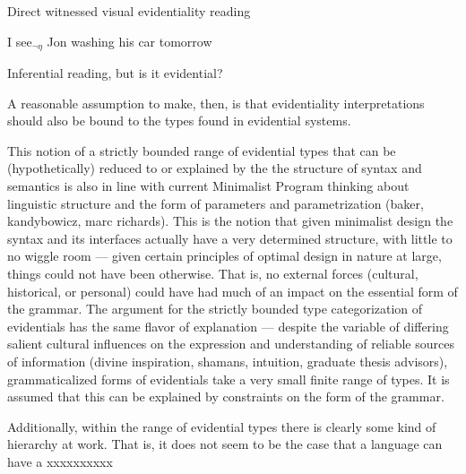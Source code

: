 \documentclass{article}
\begin{document}
\begin{exe}
\ex
\begin{xlist}
\begin{xlist}
\ex Direct witnessed visual evidentiality reading\end{xlist}
\ex I see$_{\neg\eta}$ Jon washing his car tomorrow 
\begin{xlist}
\ex Inferential reading, but is it evidential?\end{xlist} 
\end{xlist}
\end{exe}

A reasonable assumption to make, then, is that evidentiality interpretations should also be bound to the types found in evidential systems.

This notion of a strictly bounded range of evidential types that can be (hypothetically) reduced to or explained by the the structure of syntax and semantics is also in line with current Minimalist Program thinking about linguistic structure and the form of parameters and parametrization (baker, kandybowicz, marc richards). This is the notion that given minimalist design the syntax and its interfaces actually have a very determined structure, with little to no wiggle room --- given certain principles of optimal design in nature at large, things could not have been otherwise. That is, no external forces (cultural, historical, or personal) could have had much of an impact on the essential form of the grammar. The argument for the strictly bounded type categorization of evidentials has the same flavor of explanation --- despite the variable of differing salient cultural influences on the expression and understanding of reliable sources of information (divine inspiration, shamans, intuition, graduate thesis advisors), grammaticalized forms of evidentials take a very small finite range of types. It is assumed that this can be explained by constraints on the form of the grammar.

Additionally, within the range of evidential types there is clearly some kind of hierarchy at work. That is, it does not seem to be the case that a language can have a xxxxxxxxxx  
\end{document}

